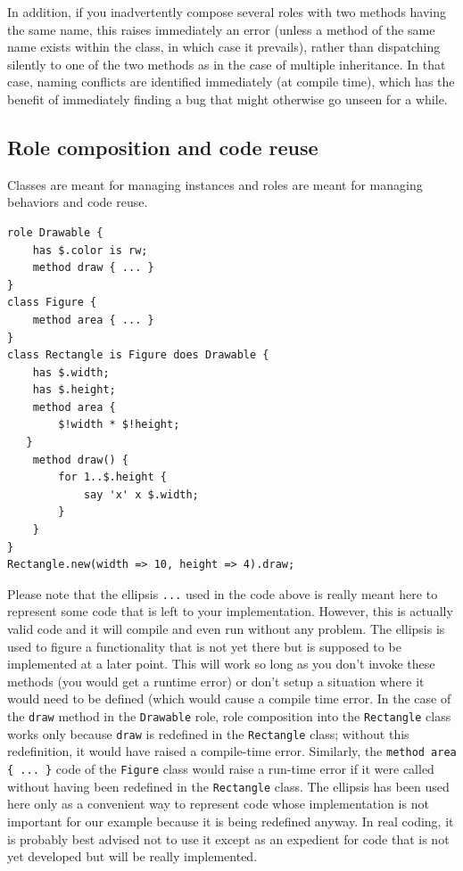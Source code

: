 
In addition, if you inadvertently compose several roles with 
two methods having the same name, this raises immediately 
an error (unless a method of the same name exists within the 
class, in which case it prevails), rather than dispatching 
silently to one of the two methods as in the case of multiple 
inheritance. In that case, naming conflicts are identified 
immediately (at compile time), which has the benefit of 
immediately finding a bug that might otherwise go 
unseen for a while.

\subsection{Role composition and code reuse}

Classes are meant for managing instances and roles are 
meant for managing behaviors and code reuse.

\begin{verbatim}
role Drawable {
    has $.color is rw;
    method draw { ... }
}
class Figure {
    method area { ... }
}
class Rectangle is Figure does Drawable {
    has $.width;
    has $.height;
    method area {
        $!width * $!height;
   }
    method draw() {
        for 1..$.height {
            say 'x' x $.width;
        }
    }
}
Rectangle.new(width => 10, height => 4).draw;
\end{verbatim}

Please note that the ellipsis \verb'...' used in the code 
above is really meant here to represent some code that is left 
to your implementation. However, this is actually valid code 
and it will compile and even run without any problem. The 
ellipsis is used to figure a functionality that is not yet 
there but is supposed to be implemented at a later point. This 
will work so long as you don't invoke these methods (you would 
get a runtime error) or don't setup a situation where it would 
need to be defined (which would cause a compile time error. 
In the case of the {\tt draw} method in the 
{\tt Drawable} role, role composition into the {\tt Rectangle} 
class works only because {\tt draw} is redefined in the 
{\tt Rectangle} class; without this redefinition, it would 
have raised a compile-time error. Similarly, 
the \verb'method area { ... }' 
code of the {\tt Figure} class would raise a run-time error if it 
were called without having been redefined in the {\tt Rectangle} 
class. The ellipsis has been used here only as a convenient way 
to represent code whose implementation is not important for 
our example because it is being redefined anyway. In real coding, 
it is probably best advised not to use it except as an expedient 
for code that is not yet developed but will be really implemented.

